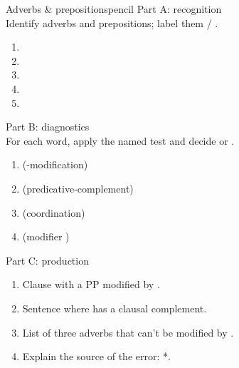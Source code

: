 \begin{tblsframedsymbol}{Adverbs \& prepositions}{pencil}
Part A: recognition\\
Identify  adverbs and prepositions; label them  / .
\begin{enumerate}[nosep, leftmargin=*]
  \item {}
  \item {}
  \item {}
  \item {}
  \item {}
\end{enumerate}

Part B: diagnostics\\
For each word, apply the named test and decide  or .
\begin{enumerate}[nosep, leftmargin=*]
  \item {} (-modification)
  \item {} (predicative-complement)
  \item {} (coordination)
  \item {} (modifier )
\end{enumerate}

Part C: production\\
\begin{enumerate}[nosep, leftmargin=*]
  \item Clause with a PP modified by .
  \item Sentence where  has a clausal complement.
  \item List of three adverbs that can't be modified by .
  \item Explain the source of the error: *.
\end{enumerate}
\end{tblsframedsymbol}


